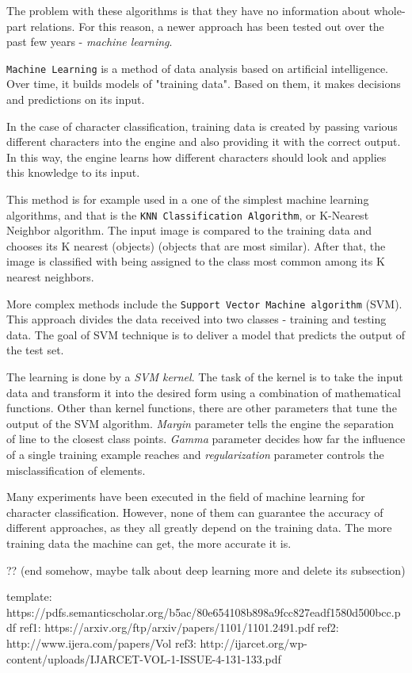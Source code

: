 The problem with these algorithms is that they have no information about whole-part relations. For this reason, a newer approach has been tested out over the past few years - \emph{machine learning}.

\texttt{Machine Learning} is a method of data analysis based on artificial intelligence. Over time, it builds models of "training data". Based on them, it makes decisions and predictions on its input. 

In the case of character classification, training data is created by passing various different characters into the engine and also providing it with the correct output. In this way, the engine learns how different characters should look and applies this knowledge to its input.

This method is for example used in a one of the simplest machine learning algorithms, and that is the \texttt{KNN Classification Algorithm}, or K-Nearest Neighbor algorithm. The input image is compared to the training data and chooses its K nearest (objects) (objects that are most similar). After that, the image is classified with being assigned to the class most common among its K nearest neighbors.

More complex methods include the \texttt{Support Vector Machine algorithm} (SVM). This approach divides the data received into two classes - training and testing data. The goal of SVM technique is to deliver a model that predicts the output of the test set.

The learning is done by a \emph{SVM kernel}. The task of the kernel is to take the input data and transform it into the desired form using a combination of mathematical functions. Other than kernel functions, there are other parameters that tune the output of the SVM algorithm. \emph{Margin} parameter tells the engine the separation of line to the closest class points. \emph{Gamma} parameter decides how far the influence of a single training example reaches and \emph{regularization} parameter controls the misclassification of elements.

Many experiments have been executed in the field of machine learning for character classification. However, none of them can guarantee the accuracy of different approaches, as they all greatly depend on the training data. The more training data the machine can get, the more accurate it is. 

?? (end somehow, maybe talk about deep learning more and delete its subsection)

template: https://pdfs.semanticscholar.org/b5ac/80e654108b898a9fcc827eadf1580d500bcc.pdf
ref1: https://arxiv.org/ftp/arxiv/papers/1101/1101.2491.pdf
ref2: http://www.ijera.com/papers/Vol%
ref3: http://ijarcet.org/wp-content/uploads/IJARCET-VOL-1-ISSUE-4-131-133.pdf

